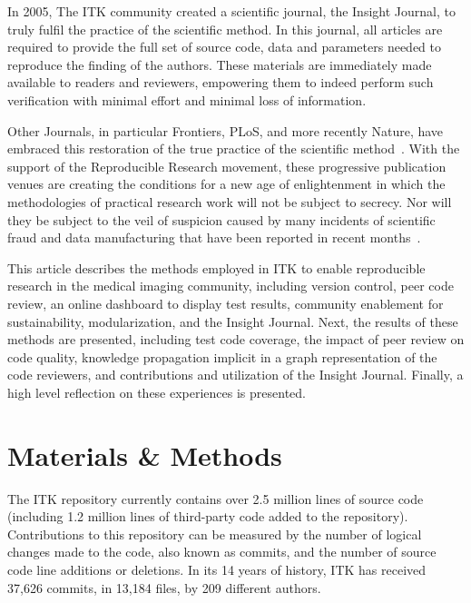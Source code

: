 \documentclass{frontiersENG} %
\begin{document}
In 2005, The ITK community created a scientific journal, the Insight Journal,
to truly fulfil the practice of the scientific method.  In this journal, all
articles are required to provide the full set of source code, data and
parameters needed to reproduce the finding of the authors. These materials are
immediately made available to readers and reviewers, empowering them to indeed
perform such verification with minimal effort and minimal loss of information.

Other Journals, in particular Frontiers, PLoS, and more recently Nature, have
embraced this restoration of the true practice of the scientific
method~\cite{NatureEditorial2013,NatureEditorial2012,Mobley2013}.  With the
support of the Reproducible Research movement, these progressive publication
venues are creating the conditions for a new age of enlightenment in which the
methodologies of practical research work will not be subject to secrecy. Nor
will they be subject to the veil of suspicion caused by many incidents of scientific fraud and
data manufacturing that have been reported in recent months~\cite{Sandve2013}.

%
%

This article describes the methods employed in ITK to enable reproducible
research in the medical imaging community, including version control, peer code
review, an online dashboard to display test results, community enablement for
sustainability, modularization, and the Insight Journal.  Next, the results of
these methods are presented, including test code coverage, the impact of peer
review on code quality, knowledge propagation implicit in a graph
representation of the code reviewers, and contributions and utilization of the
Insight Journal.  Finally, a high level reflection on these experiences is
presented.


\section{Materials \& Methods}
The ITK repository currently contains over 2.5 million lines of source code
(including 1.2 million lines of third-party code added to the repository).
Contributions to this repository can be measured by the number of logical
changes made to the code, also known as commits, and the number of source code
line additions or deletions. In its 14 years of history, ITK has received
37,626 commits, in 13,184 files, by 209 different authors.
\end{document}
